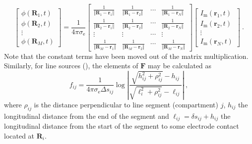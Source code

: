 \begin{equation}
\begin{bmatrix}
\phi(\mathbf{R}_1, t) \\
\phi(\mathbf{R}_2, t) \\
\vdots \\
\phi(\mathbf{R}_M, t)
\end{bmatrix}
= \frac{1}{4\pi\sigma_\mathrm{e}}
\begin{bmatrix}
\frac{1}{\Vert\mathbf{R}_1 - \mathbf{r}_1\Vert} & \frac{1}{\Vert\mathbf{R}_1 - \mathbf{r}_2\Vert} & \cdots & \frac{1}{\Vert\mathbf{R}_1 - \mathbf{r}_N\Vert} \\
\frac{1}{\Vert\mathbf{R}_2 - \mathbf{r}_1\Vert} & \frac{1}{\Vert\mathbf{R}_2 - \mathbf{r}_2\Vert} & \cdots & \frac{1}{\Vert\mathbf{R}_2 - \mathbf{r}_N\Vert} \\
\vdots & \vdots & \cdots & \vdots \\
\frac{1}{\Vert\mathbf{R}_M - \mathbf{r}_1\Vert} & \frac{1}{\Vert\mathbf{R}_M - \mathbf{r}_2\Vert} & \cdots & \frac{1}{\Vert\mathbf{R}_M - \mathbf{r}_N\Vert}
\end{bmatrix}
\begin{bmatrix}
I_\mathrm{m}(\mathbf{r}_1, t) \\
I_\mathrm{m}(\mathbf{r}_2, t) \\
\vdots \\
I_\mathrm{m}(\mathbf{r}_N, t)
\end{bmatrix} ~.
\end{equation}
%
Note that the constant terms have been moved out of the matrix multiplication.
Similarly, for line sources (), the elements of $\mathbf{F}$ may be calculated as
%
\begin{equation}
f_{ij} = \frac{1}{4\pi \sigma_\mathrm{e} \Delta s_{ij}} \log \left| \frac{\sqrt{h_{ij}^2+\rho_{ij}^2}-h_{ij}}{\sqrt{\ell_i^2+\rho_{ij}^2}-\ell_{ij}} \right| ~,
\label{eq:LFPy:linesources}
\end{equation}
%
where $\rho_{ij}$ is the distance perpendicular to line segment (compartment) $j$,
$h_{ij}$ the longitudinal distance from the end of the segment
and $\ell_{ij} = \delta s_{ij} + h_{ij}$ the longitudinal distance from the start of the segment to some electrode contact located at $\mathbf{R}_i$.

